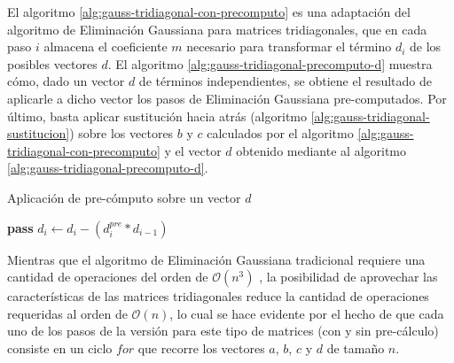 El algoritmo \ref{alg:gauss-tridiagonal-con-precomputo} es una adaptación del algoritmo de Eliminación Gaussiana para matrices tridiagonales, que en cada paso $i$ almacena el coeficiente $m$ necesario para transformar el término $d_{i}$ de los posibles vectores $d$. El algoritmo \ref{alg:gauss-tridiagonal-precomputo-d} muestra cómo, dado un vector $d$ de términos independientes, se obtiene el resultado de aplicarle a dicho vector los pasos de Eliminación Gaussiana pre-computados. Por último, basta aplicar sustitución hacia atrás (algoritmo \ref{alg:gauss-tridiagonal-sustitucion}) sobre los vectores $b$ y $c$ calculados por el algoritmo \ref{alg:gauss-tridiagonal-con-precomputo} y el vector $d$ obtenido mediante al algoritmo \ref{alg:gauss-tridiagonal-precomputo-d}.

\begin{algorithm}[H]
\caption{Aplicación de pre-cómputo sobre un vector $d$}\label{alg:gauss-tridiagonal-precomputo-d}
\begin{algorithmic}
        \State \textbf{pass} 
    \Else
        \State $d_{i} \gets d_{i} - (d^{pre}_{i} * d_{i-1}) $
    \EndIf
\EndFor
\end{algorithmic}
\end{algorithm}

Mientras que el algoritmo de Eliminación Gaussiana tradicional requiere una cantidad de operaciones del orden de $\mathcal{O}(n^{3})$ \cite{burden-gauss}, la posibilidad de aprovechar las características de las matrices tridiagonales reduce la cantidad de operaciones requeridas al orden de $\mathcal{O}(n)$, lo cual se hace evidente por el hecho de que cada uno de los pasos de la versión para este tipo de matrices (con y sin pre-cálculo) consiste en un ciclo $for$ que recorre los vectores $a$, $b$, $c$ y $d$ de tamaño $n$.